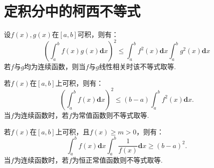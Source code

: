 \section{定积分中的柯西不等式}

\begin{theorem}
	设$f(x),g(x)$在$[a,b]$可积，则有：
	\begin{equation}
		\left(\int_{a}^{b}f(x)g(x)\textbf{d}x\right)^2 \leq \int_{a}^{b}f^2(x)\textbf{d}x\int_{a}^{b}g^2(x)\textbf{d}x
	\end{equation}
	若$f$与$g$均为连续函数，则当$f$与$g$线性相关时该不等式取等.
\end{theorem}

\begin{corollary}
	若$f(x)$在$[a,b]$上可积，则有：
	\begin{equation}
		\left(\int_{a}^{b}f(x)\textbf{d}x\right)^2 \leq (b-a)\int_{a}^{b}f^2(x)\textbf{d}x.
	\end{equation}
	当$f$为连续函数时，若$f$为常值函数则不等式取等.
\end{corollary}

\begin{corollary}
	若$f(x)$在$[a,b]$上可积，且$f(x)\geq m>0$，则有：
	\begin{equation}
		\int_{a}^{b}f(x)\textbf{d}x\int_{a}^{b}\dfrac{1}{f(x)}\textbf{d}x \geq (b-a)^2.
	\end{equation}
	当$f$为连续函数时，若$f$为恒正常值函数则不等式取等.
\end{corollary}